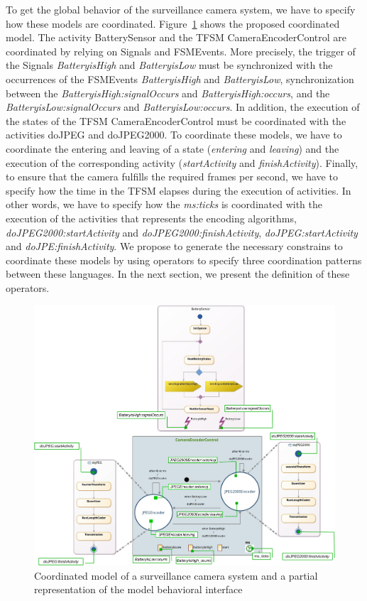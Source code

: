 To get the global behavior of the surveillance camera system, we have to specify how these models are coordinated. Figure~\ref{fig:cameramodel} shows the proposed coordinated model. The activity BatterySensor and the TFSM CameraEncoderControl are coordinated by relying on Signals and FSMEvents. More precisely, the trigger of the Signals \emph{BatteryisHigh} and \emph{BatteryisLow} must be synchronized with the occurrences of the FSMEvents \emph{BatteryisHigh} and \emph{BatteryisLow}, \ie synchronization between the \mse \emph{BatteryisHigh:signalOccurs} and \emph{BatteryisHigh:occurs}, and the \mse \emph{BatteryisLow:signalOccurs} and  \emph{BatteryisLow:occurs}. In addition, the execution of the states of the TFSM CameraEncoderControl must be coordinated with the activities doJPEG and doJPEG2000. To coordinate these models, we have to coordinate the entering and leaving of a state (\ie \dse \emph{entering} and \emph{leaving}) and the execution of the corresponding activity (\ie \dse \emph{startActivity} and \emph{finishActivity}). Finally, to ensure that the camera fulfills the required frames per second, we have to specify how the time in the TFSM elapses during the execution of activities. In other words, we have to specify how the \mse \emph{ms:ticks} is coordinated with the execution of the activities that represents the encoding algorithms, \eg \emph{doJPEG2000:startActivity} and \emph{doJPEG2000:finishActivity}, \emph{doJPEG:startActivity} and \emph{doJPE:finishActivity}. We propose to generate the necessary constrains to coordinate these models by using \bcool operators to specify three coordination patterns between these languages. In the next section, we present the definition of these operators.  

	
	\begin{figure}[h]
		\center
		\includegraphics[width=1\columnwidth]{examples/figs/picmodels.pdf}
		\caption{Coordinated model of a surveillance camera system and a partial representation of the model behavioral interface}
		\label{fig:cameramodel}
	\end{figure}

